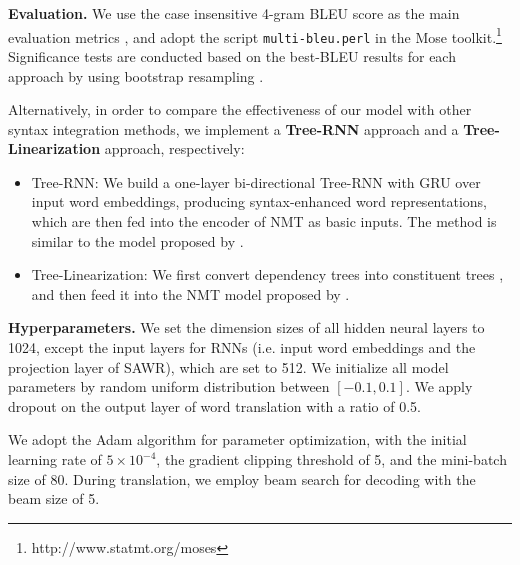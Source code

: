 \documentclass[11pt,a4paper]{article}
\begin{document}
\begin{CJK}{UTF8}{gbsn}
\textbf{Evaluation.}
We use the case insensitive 4-gram BLEU score as the main evaluation metrics  \cite{papineni-EtAl:2002:ACL},
and adopt the script \texttt{multi-bleu.perl} in the Mose toolkit.\footnote{http://www.statmt.org/moses}
Significance tests are conducted based on the best-BLEU results for each approach by using bootstrap resampling \cite{koehn:2004:EMNLP}.


Alternatively, in order to compare the effectiveness of our model with other syntax integration methods,
we implement a \textbf{Tree-RNN} approach and a \textbf{Tree-Linearization} approach,
respectively:
\begin{itemize}
  \item Tree-RNN: We build a one-layer bi-directional Tree-RNN with GRU over input word embeddings,
  producing syntax-enhanced word representations, which are then fed into the encoder of NMT as basic inputs.
  The method is similar to the model proposed by .
  \item Tree-Linearization: We first convert dependency trees into constituent trees \cite{weiweisuntacl13}, and then feed it into the NMT model proposed by .
\end{itemize}




\textbf{Hyperparameters.}
We set the dimension sizes of all hidden neural layers to 1024,
except the input layers for RNNs (i.e. input word embeddings and the projection layer of SAWR),
which are set to 512.
We initialize all model parameters by random uniform distribution between $[-0.1, 0.1]$.
We apply dropout on the output layer of word translation with a ratio of 0.5.

We adopt the Adam algorithm \cite{kingma2014adam} for parameter optimization, with the initial learning rate of $5\times 10^{-4}$,
the gradient clipping threshold of 5, and the mini-batch size of 80.
During translation, we employ beam search for decoding with the beam size of 5.



\end{CJK}
\end{document}
